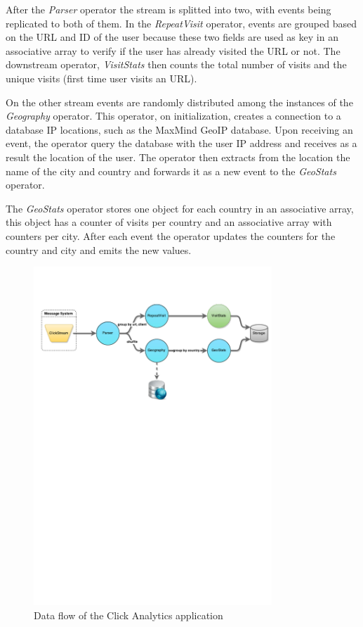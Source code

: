 \documentclass[ppgc,diss,english]{iiufrgs}
\begin{document}
After the \emph{Parser} operator the stream is splitted into two, with events being replicated to both of them. In the \emph{RepeatVisit} operator, events are grouped based on the URL and ID of the user because these two fields are used as key in an associative array to verify if the user has already visited the URL or not. The downstream operator, \emph{VisitStats} then counts the total number of visits and the unique visits (first time user visits an URL).

On the other stream events are randomly distributed among the instances of the \emph{Geography} operator. This operator, on initialization, creates a connection to a database IP locations, such as the MaxMind GeoIP database. Upon receiving an event, the operator query the database with the user IP address and receives as a result the location of the user. The operator then extracts from the location the name of the city and country and forwards it as a new event to the \emph{GeoStats} operator.

The \emph{GeoStats} operator stores one object for each country in an associative array, this object has a counter of visits per country and an associative array with counters per city. After each event the operator updates the counters for the country and city and emits the new values.

\begin{figure}[!ht]
	\centering
	\includegraphics[width=0.8\textwidth]{images/apps/ClickAnalytics.pdf}
	\caption{Data flow of the Click Analytics application}
	\label{fig:app_click_analytics}
\end{figure}
\end{document}
